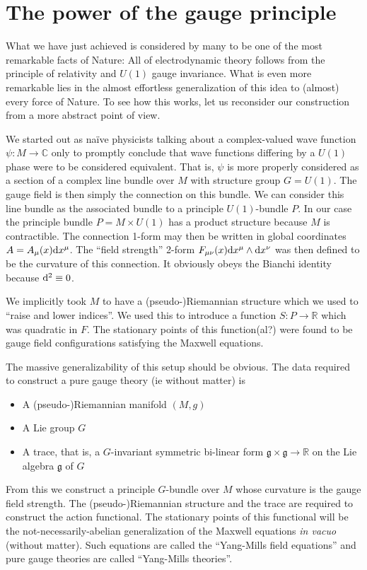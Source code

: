 \documentclass[12pt]{article}
\begin{document}
\section{The power of the gauge principle}

What we have just achieved is considered by many to be one of the most remarkable facts of Nature: All of electrodynamic theory follows from the principle of relativity and $U(1)$ gauge invariance. What is even more remarkable lies in the almost effortless generalization of this idea to (almost) every force of Nature. To see how this works, let us reconsider our construction from a more abstract point of view. 

We started out as na\"{i}ve physicists talking about a complex-valued wave function $\psi: M\to {\mathbb C}$ only to promptly conclude that wave functions differing by a $U(1)$ phase were to be considered equivalent. That is, $\psi$ is more properly considered as a section of a complex line bundle over $M$ with structure group $G=U(1)$. The gauge field is then simply the connection on this bundle. We can consider this line bundle as the associated bundle to a principle $U(1)$-bundle $P$. In our case the principle bundle $P=M\times U(1)$ has a product structure because $M$ is contractible. The connection 1-form may then be written in global coordinates $A=A_\mu(x) {\rm d}x^\mu$.
The ``field strength'' 2-form $F_{\mu \nu}(x){\rm d}x^\mu\wedge {\rm d}x^\nu$ was then defined to be the curvature of this connection. It obviously obeys the Bianchi identity because ${\rm d}^2\equiv 0$. 

We implicitly took $M$ to have a (pseudo-)Riemannian structure which we used to ``raise and lower indices''. We used this to introduce a function $S:P\to {\mathbb R}$ which was quadratic in $F$. The stationary points of this function(al?) were found to be gauge field configurations satisfying the Maxwell equations.

The massive generalizability of this setup should be obvious. The data required to construct a pure gauge theory (ie without matter) is
\begin{itemize}
\item A (pseudo-)Riemannian manifold $(M, g)$
\item A Lie group $G$
\item A trace, that is, a $G$-invariant symmetric bi-linear form ${\mathfrak g}\times {\mathfrak g}\to {\mathbb R}$ on the Lie algebra ${\mathfrak g}$ of $G$
\end{itemize}
 From this we construct a principle $G$-bundle over $M$ whose curvature is the gauge field strength. The (pseudo-)Riemannian structure and the trace are required to construct the action functional. The stationary points of this functional will be the not-necessarily-abelian generalization of the Maxwell equations {\it in vacuo} (without matter). Such equations are called the ``Yang-Mills field equations'' and pure gauge theories are called ``Yang-Mills theories''.
\end{document}
